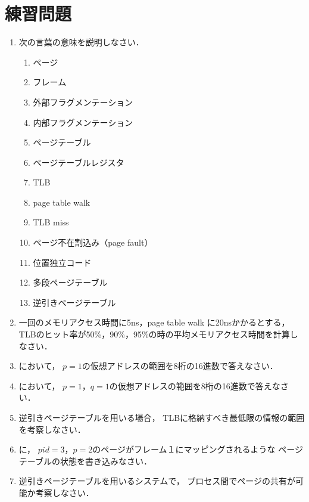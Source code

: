 \section*{練習問題}
\begin{enumerate}
  \renewcommand{\labelenumi}{\ttfamily\arabic{chapter}.\arabic{enumi}}
  \setlength{\leftskip}{1em}
\item 次の言葉の意味を説明しなさい．
  \begin{enumerate}
  \item ページ
  \item フレーム
  \item 外部フラグメンテーション
  \item 内部フラグメンテーション
  \item ページテーブル
  \item ページテーブルレジスタ
  \item TLB
  \item page table walk
  \item TLB miss
  \item ページ不在割込み（page fault）
  \item 位置独立コード
  \item 多段ページテーブル
  \item 逆引きページテーブル
  \end{enumerate}
\item 一回のメモリアクセス時間に5ns，page table walk に20nsかかるとする，
  TLBのヒット率が50\%，90\%，95\%の時の平均メモリアクセス時間を計算しなさい．
\item {}において，
  $p=1$の仮想アドレスの範囲を8桁の16進数で答えなさい．
\item {}において，
  $p=1$，$q=1$の仮想アドレスの範囲を8桁の16進数で答えなさい．
\item 逆引きページテーブルを用いる場合，
  TLBに格納すべき最低限の情報の範囲を考察しなさい．
\item {}に，
  $pid=3$，$p=2$のページがフレーム１にマッピングされるような
  ページテーブルの状態を書き込みなさい．
\item 逆引きページテーブルを用いるシステムで，
  プロセス間でページの共有が可能か考察しなさい．
\end{enumerate}
